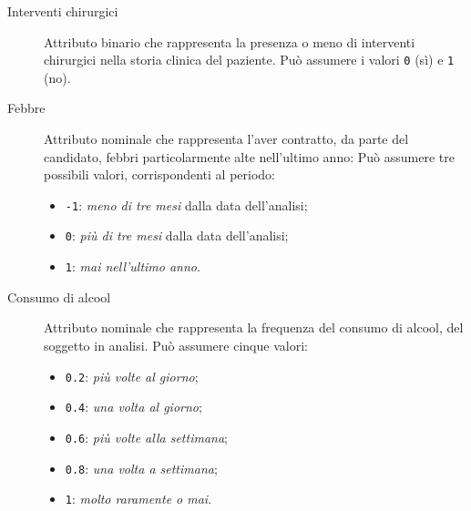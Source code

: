 \documentclass[a4paper,11pt,twoside,notitlepage,final]{scrartcl}
\begin{document}
\begin{description}
  \item[Interventi chirurgici]
    Attributo binario che rappresenta la presenza o meno di interventi chirurgici nella storia clinica del paziente.
    Può assumere i valori \texttt{0} (sì) e \texttt{1} (no).
  \item[Febbre]
    Attributo nominale che rappresenta l'aver contratto, da parte del candidato, febbri particolarmente alte nell'ultimo anno:
    Può assumere tre possibili valori, corrispondenti al periodo:
    \begin{itemize}
      \item \texttt{-1}: \emph{meno di tre mesi} dalla data dell'analisi;
      \item \texttt{0}: \emph{più di tre mesi} dalla data dell'analisi;
      \item \texttt{1}: \emph{mai nell'ultimo anno}.
    \end{itemize}
  \item[Consumo di alcool]
    Attributo nominale che rappresenta la frequenza del consumo di alcool, del soggetto in analisi.
    Può assumere cinque valori:
    \begin{itemize}
      \item \texttt{0.2}: \emph{più volte al giorno};
      \item \texttt{0.4}: \emph{una volta al giorno};
      \item \texttt{0.6}: \emph{più volte alla settimana};
      \item \texttt{0.8}: \emph{una volta a settimana};
      \item \texttt{1}: \emph{molto raramente o mai}.

\end{itemize}
\end{description}
\end{document}
